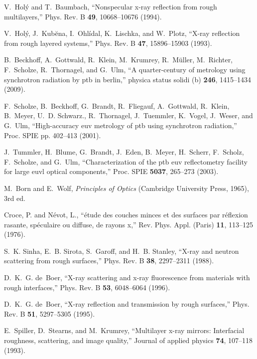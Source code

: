 \documentclass[twocolumn,osajnl,showpacs,superscriptaddress,11pt]{revtex4-1}
\begin{document}
\begin{thebibliography}{10}
V.~Hol\'y and T.~Baumbach, \enquote{Nonspecular x-ray reflection from rough
  multilayers,} Phys. Rev. B \textbf{49}, 10668--10676 (1994).

V.~Hol\'y, J.~Kub\u{e}na, I.~Ohl\'idal, K.~Lischka, and W.~Plotz,
  \enquote{X-ray reflection from rough layered systems,} Phys. Rev. B
  \textbf{47}, 15896--15903 (1993).

B.~Beckhoff, A.~Gottwald, R.~Klein, M.~Krumrey, R.~M{\"u}ller, M.~Richter,
  F.~Scholze, R.~Thornagel, and G.~Ulm, \enquote{A quarter-century of metrology
  using synchrotron radiation by ptb in berlin,} physica status solidi (b)
  \textbf{246}, 1415--1434 (2009).

F.~Scholze, B.~Beckhoff, G.~Brandt, R.~Fliegauf, A.~Gottwald, R.~Klein,
  B.~Meyer, U.~D. Schwarz., R.~Thornagel, J.~Tuemmler, K.~Vogel, J.~Weser, and
  G.~Ulm, \enquote{High-accuracy euv metrology of ptb using synchrotron
  radiation,} Proc. SPIE pp. 402--413 (2001).

J.~Tummler, H.~Blume, G.~Brandt, J.~Eden, B.~Meyer, H.~Scherr, F.~Scholz,
  F.~Scholze, and G.~Ulm, \enquote{Characterization of the ptb euv
  reflectometry facility for large euvl optical components,} Proc. SPIE
  \textbf{5037}, 265--273 (2003).

M.~Born and E.~Wolf, \emph{Principles of Optics} (Cambridge University Press,
  1965), 3rd ed.

{Croce, P.} and {N\'evot, L.}, \enquote{\'etude des couches minces et des
  surfaces par r\'eflexion rasante, sp\'eculaire ou diffuse, de rayons x,} Rev.
  Phys. Appl. (Paris) \textbf{11}, 113--125 (1976).

S.~K. Sinha, E.~B. Sirota, S.~Garoff, and H.~B. Stanley, \enquote{X-ray and
  neutron scattering from rough surfaces,} Phys. Rev. B \textbf{38}, 2297--2311
  (1988).

D.~K.~G. de~Boer, \enquote{X-ray scattering and x-ray fluorescence from
  materials with rough interfaces,} Phys. Rev. B \textbf{53}, 6048--6064
  (1996).

D.~K.~G. de~Boer, \enquote{X-ray reflection and transmission by rough
  surfaces,} Phys. Rev. B \textbf{51}, 5297--5305 (1995).

E.~Spiller, D.~Stearns, and M.~Krumrey, \enquote{Multilayer x-ray mirrors:
  Interfacial roughness, scattering, and image quality,} Journal of applied
  physics \textbf{74}, 107--118 (1993).


\end{thebibliography}
\end{document}
